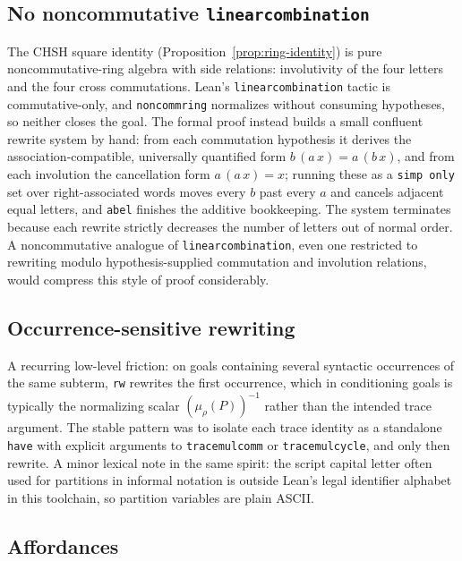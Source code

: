\documentclass[11pt]{article}
\renewcommand{\_}{\textunderscore\allowbreak}
\theoremstyle{remark}
\begin{document}
\subsection{No noncommutative \texttt{linear\_combination}}

The CHSH square identity (Proposition~\ref{prop:ring-identity}) is pure noncommutative-ring algebra with side relations: involutivity of the four letters and the four cross commutations. Lean's \texttt{linear\_combination} tactic is commutative-only, and \texttt{noncomm\_ring} normalizes without consuming hypotheses, so neither closes the goal. The formal proof instead builds a small confluent rewrite system by hand: from each commutation hypothesis it derives the association-compatible, universally quantified form $b\,(a\,x) = a\,(b\,x)$, and from each involution the cancellation form $a\,(a\,x) = x$; running these as a \texttt{simp only} set over right-associated words moves every $b$ past every $a$ and cancels adjacent equal letters, and \texttt{abel} finishes the additive bookkeeping. The system terminates because each rewrite strictly decreases the number of letters out of normal order. A noncommutative analogue of \texttt{linear\_combination}, even one restricted to rewriting modulo hypothesis-supplied commutation and involution relations, would compress this style of proof considerably.

\subsection{Occurrence-sensitive rewriting}

A recurring low-level friction: on goals containing several syntactic occurrences of the same subterm, \texttt{rw} rewrites the first occurrence, which in conditioning goals is typically the normalizing scalar $(\mu_\rho(P))^{-1}$ rather than the intended trace argument. The stable pattern was to isolate each trace identity as a standalone \texttt{have} with explicit arguments to \texttt{trace\_mul\_comm} or \texttt{trace\_mul\_cycle}, and only then rewrite. A minor lexical note in the same spirit: the script capital letter often used for partitions in informal notation is outside Lean's legal identifier alphabet in this toolchain, so partition variables are plain ASCII.

\subsection{Affordances}
\end{document}
